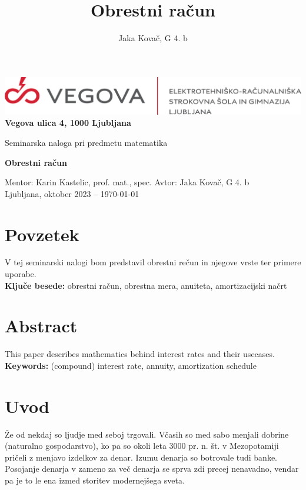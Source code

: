\documentclass[12pt]{article}
\title{Obrestni račun}
\author{Jaka Kovač, G 4. b}
\begin{document}

\begin{center}
    \thispagestyle{empty}
    \includegraphics[scale=1]{slike/logotip_vegova_leze_brezokvirja.png}
    \\
    \textbf{Vegova ulica 4, 1000 Ljubljana}

    \vspace{\fill} 
    Seminarska naloga pri predmetu matematika

    \Huge{\textbf{Obrestni račun}}

    \normalsize
    \vspace{\fill}

    Mentor: Karin Kastelic, prof. mat., spec. \hfill Avtor: Jaka Kovač, G 4. b\\
    \null
    Ljubljana, oktober 2023 – \MMYYYYdate\today 
\end{center}
\newpage
\thispagestyle{empty}
\null
\newpage

\section*{Povzetek}
V tej seminarski nalogi bom predstavil obrestni rečun in njegove vrste ter primere uporabe.
\\ %
\textbf{Ključe besede:} obrestni račun, obrestna mera, anuiteta, amortizacijski načrt

\vfill
\section*{Abstract}
\foreignlanguage{english}{This paper describes mathematics behind interest rates and their
usecases.
\\ %
\textbf{Keywords:} (compound) interest rate, annuity, amortization schedule}
\vfill

\newpage
\thispagestyle{empty} %
\tableofcontents %
\listoffigures   %
\listoftables    %

\newpage
\section{Uvod}
Že od nekdaj so ljudje med seboj trgovali. Včasih so med sabo menjali dobrine (naturalno 
gospodarstvo), ko pa so okoli leta 3000 pr. n. št. v Mezopotamiji \cite{wiki:money} pričeli
z menjavo izdelkov za denar. Izumu denarja so botrovale tudi banke. Posojanje denarja v 
zameno za več denarja se sprva zdi precej nenavadno, vendar pa je to le ena izmed storitev
modernejšega sveta. 
\end{document}
